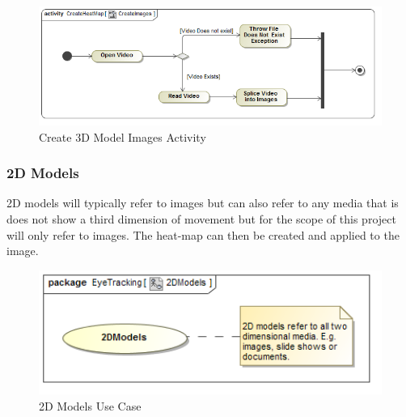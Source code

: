\begin{enumerate}
		\begin{figure}[!ht]
			\centering
			\includegraphics[scale=0.5,width=15cm,keepaspectratio]{Diagrams/Activity_Diagram__CreateHeatMap__CreateImages.png}
			\caption{Create 3D Model Images Activity}
		\end{figure}
	\end{enumerate}

	\subsubsection{2D Models}
	2D models will typically refer to images but can also refer to any media that is does not show a third dimension of movement but for the scope of this project will only refer to images. The heat-map can then be created and applied to the image.
	\newline
	\begin{figure}[!ht]
		\centering
		\includegraphics[scale=0.5,width=15cm,keepaspectratio]{Diagrams/Use_Case_Diagram__2DModels.png}
		\caption{2D Models Use Case}
	\end{figure}
